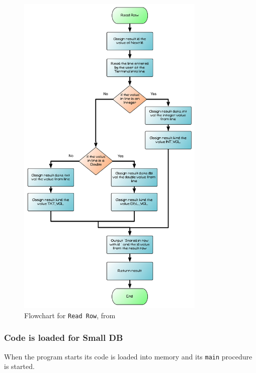 \begin{figure}[p]
   \centering
   \includegraphics[width=0.80\textwidth]{./topics/type-decl/diagrams/ReadRowFlow} 
   \caption{Flowchart for \texttt{Read Row}, from }
   \label{fig:read-row-flow-understanding}
\end{figure}

\clearpage
\subsubsection{Code is loaded for Small DB} %
\label{ssub:code_is_loaded_for_small_db}

When the program starts its code is loaded into memory and its \texttt{main} procedure is started.

